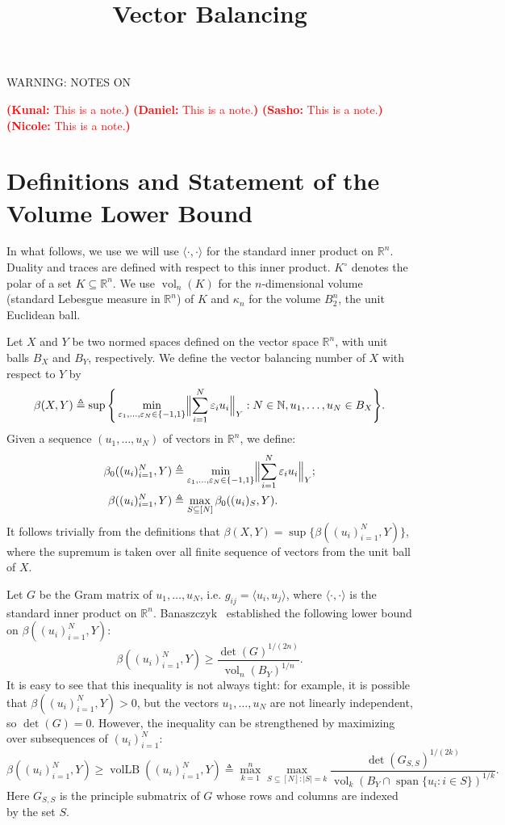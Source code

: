 \documentclass{article}
\newcommand{\R}{{\mathbb{R}}}
\newcommand\eps{\varepsilon}
\newcommand{\eqdef}{\triangleq}
\DeclareMathOperator{\vollb}{volLB}
\DeclareMathOperator{\vol}{vol}
\DeclareMathOperator{\lspan}{span}
\newcommand{\notename}[2]{{\textcolor{red}{\footnotesize{\bf (#1:} {#2}{\bf ) }}}}
\newcommand{\noteswarning}{{\begin{center} {\Large WARNING: NOTES ON}\end{center}}}
\newcommand{\knote}[1]{{\notename{Kunal}{#1}}}
\newcommand{\nnote}[1]{{\notename{Nicole}{#1}}}
\newcommand{\dnote}[1]{{\notename{Daniel}{#1}}}
\newcommand{\snote}[1]{{\notename{Sasho}{#1}}}
\newcommand{\notename}[2]{{}}
\newcommand{\noteswarning}{{}}
\newcommand{\knote}[1]{}
\newcommand{\nnote}[1]{}
\newcommand{\dnote}[1]{}
\newcommand{\snote}[1]{}
\begin{document}
\title{Vector Balancing}
\maketitle

\noteswarning

\knote{This is a note.}
\dnote{This is a note.}
\snote{This is a note.}
\nnote{This is a note.}

\section{Definitions and Statement of the Volume Lower Bound}


In what follows, we use we will use $\langle \cdot, \cdot \rangle$
for the standard inner product on $\R^n$. Duality and traces are
defined with respect to this inner product. $K^\circ$ denotes the
polar of a set $K \subseteq \R^n$. We use $\vol_n(K)$ for the
$n$-dimensional volume (standard Lebesgue measure in $\R^n$) of $K$ and
$\kappa_n$ for the volume $B_2^n$, the unit Euclidean ball.

Let $X$ and $Y$ be two normed spaces defined on the vector space
$\R^n$, with unit balls $B_X$ and $B_Y$, respectively. We define
the vector balancing number of $X$ with respect to $Y$ by
\[
\beta(X, Y) \eqdef \sup\Bigg\{ 
\min_{\eps_1, \ldots,\eps_N \in \{-1, 1\}} \Bigl\|\sum_{i = 1}^N{\eps_i u_i}\Bigr\|_{Y}: N \in \mathbb{N},
u_1, \ldots, u_N \in B_X\Bigg\}.
\]
Given a sequence $(u_1, \ldots, u_N)$ of vectors in $\R^n$, we define:
\begin{align*}
\beta_0((u_i)_{i = 1}^N,Y) &\eqdef \min_{\eps_1, \ldots,\eps_N \in
  \{-1, 1\}}
\Bigl\|\sum_{i = 1}^N{\eps_i u_i}\Bigr\|_{Y};\\
\beta((u_i)_{i = 1}^N, Y) &\eqdef \max_{S \subseteq  [N]}{\beta_0((u_i)_S, Y)}.
\end{align*}
It follows trivially from the definitions that $\beta(X, Y) =
\sup\{\beta((u_i)_{i = 1}^N, Y)\}$, where the supremum is taken over all
finite sequence of vectors from the unit ball of $X$.

Let $G$ be the Gram matrix of $u_1, \ldots, u_N$, i.e. $g_{ij} =
\langle u_i, u_j \rangle$, where $\langle \cdot, \cdot \rangle$ is
the standard inner product on $\R^n$.  Banaszczyk~\cite{Bana93}
established the following lower bound on $\beta((u_i)_{i = 1}^N, Y)$:
\[
\beta((u_i)_{i = 1}^N, Y) \ge \frac{\det(G)^{1/(2n)}}{\vol_n(B_Y)^{1/n}}.
\]
It is easy to see that this inequality is not always tight: for
example, it is possible that $\beta((u_i)_{i = 1}^N, Y) > 0$, but the
vectors $u_1, \ldots, u_N$ are not linearly independent, so $\det(G) =
0$. However, the inequality can be  strengthened by
maximizing over subsequences of $(u_i)_{i = 1}^N$:
\begin{equation}
  \label{eq:vol-lb}
  \beta((u_i)_{i = 1}^N, Y) \ge \vollb((u_i)_{i = 1}^N, Y) \eqdef
  \max_{k = 1}^n \max_{S \subseteq [N]:|S| = k} \frac{\det(G_{S,S})^{1/(2k)}}{\vol_k(B_Y \cap \lspan\{u_i: i \in S\})^{1/k}}.
\end{equation}
Here $G_{S,S}$ is the principle submatrix of $G$ whose rows and
columns are indexed by the set $S$.
\end{document}
